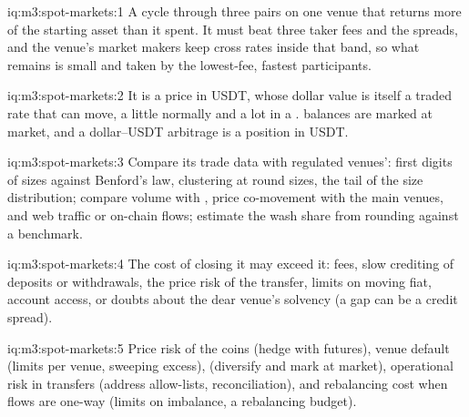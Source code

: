 \begin{solution}{iq:m3:spot-markets:1}
A cycle through three pairs on one venue that returns more of the starting asset than it spent. It must beat three
taker fees and the spreads, and the venue's market makers keep cross rates inside that band, so what remains is small
and taken by the lowest-fee, fastest participants.
\end{solution}

\begin{solution}{iq:m3:spot-markets:2}
It is a price in USDT, whose dollar value is itself a traded rate that can move, a little normally and a lot in a
.  balances are marked at market, and a dollar--USDT arbitrage is a position in USDT.
\end{solution}

\begin{solution}{iq:m3:spot-markets:3}
Compare its trade data with regulated venues': first digits of sizes against Benford's law, clustering at round
sizes, the tail of the size distribution; compare volume with , price co-movement with the main venues,
and web traffic or on-chain flows; estimate the wash share from rounding against a benchmark.
\end{solution}

\begin{solution}{iq:m3:spot-markets:4}
The cost of closing it may exceed it: fees, slow crediting of deposits or withdrawals, the price risk of the transfer,
limits on moving fiat, account access, or doubts about the dear venue's solvency (a gap can be a credit spread).
\end{solution}

\begin{solution}{iq:m3:spot-markets:5}
Price risk of the coins (hedge with futures), venue default (limits per venue, sweeping excess),  
(diversify and mark at market), operational risk in transfers (address allow-lists, reconciliation), and rebalancing
cost when flows are one-way (limits on imbalance, a rebalancing budget).
\end{solution}

